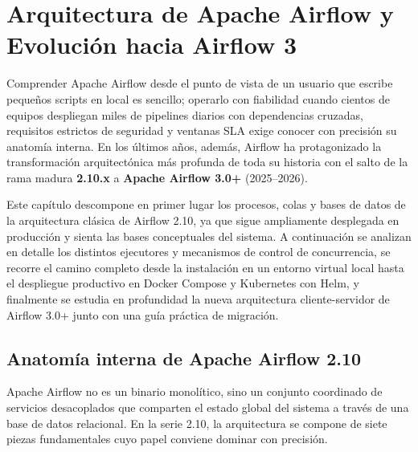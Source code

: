 
\chapter{Arquitectura de Apache Airflow y Evolución hacia Airflow 3}\label{chap:airflow-arquitectura}

Comprender Apache Airflow desde el punto de vista de un usuario que escribe pequeños scripts en local es sencillo; operarlo con fiabilidad cuando cientos de equipos despliegan miles de pipelines diarios con dependencias cruzadas, requisitos estrictos de seguridad y ventanas SLA exige conocer con precisión su anatomía interna. En los últimos años, además, Airflow ha protagonizado la transformación arquitectónica más profunda de toda su historia con el salto de la rama madura \textbf{2.10.x} a \textbf{Apache Airflow 3.0+} (2025--2026).

Este capítulo descompone en primer lugar los procesos, colas y bases de datos de la arquitectura clásica de Airflow 2.10, ya que sigue ampliamente desplegada en producción y sienta las bases conceptuales del sistema. A continuación se analizan en detalle los distintos ejecutores y mecanismos de control de concurrencia, se recorre el camino completo desde la instalación en un entorno virtual local hasta el despliegue productivo en Docker Compose y Kubernetes con Helm, y finalmente se estudia en profundidad la nueva arquitectura cliente-servidor de Airflow 3.0+ junto con una guía práctica de migración.

\section{Anatomía interna de Apache Airflow 2.10}\label{sec:anatomia-airflow-2}

Apache Airflow no es un binario monolítico, sino un conjunto coordinado de servicios desacoplados que comparten el estado global del sistema a través de una base de datos relacional. En la serie 2.10, la arquitectura se compone de siete piezas fundamentales cuyo papel conviene dominar con precisión.

